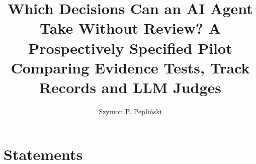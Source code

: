 \documentclass[sigconf,nonacm]{acmart}
\begin{document}
\title[Which Decisions Can an AI Agent Take Without Review?]{Which Decisions Can an AI Agent Take Without Review? A Prospectively Specified Pilot Comparing Evidence Tests, Track Records and LLM Judges}

\author{Szymon P. Pepli\'nski}

\begin{abstract}

\end{abstract}


\maketitle















\section*{Statements}





\appendix

\end{document}
